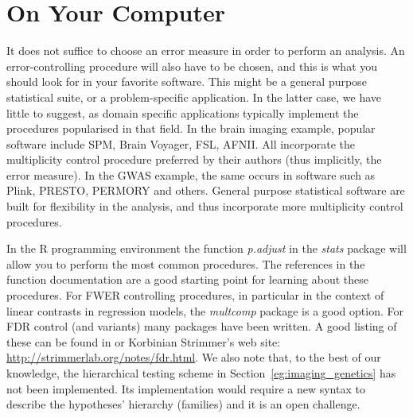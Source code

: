 \documentclass[review,12pt]{article}
\theoremstyle{definition}
\begin{document}








\appendix

\section{\label{sec:on_your_pc} On Your Computer}
It does not suffice to choose an error measure in order to perform an analysis. An error-controlling procedure will also have to be chosen, and this is what you should look for in your favorite software. This might be a general purpose statistical suite, or a problem-specific application. In the latter case, we have little to suggest, as domain specific applications typically implement the procedures popularised in that field. 
In the brain imaging example, popular software include SPM, Brain Voyager, FSL, AFNII. All incorporate the multiplicity control procedure preferred by their authors (thus implicitly, the error measure). 
In the GWAS example, the same occurs in software such as Plink, PRESTO, PERMORY and others. 
General purpose statistical software are built for flexibility in the analysis, and thus incorporate more multiplicity control procedures. 

In the R programming environment \citep{r_development_core_team_r:_2011} the function \emph{p.adjust} in the \emph{stats} package will allow you to perform the most common procedures. The references in the function documentation are a good starting point for learning about these procedures. 
For FWER controlling procedures, in particular in the context of linear contrasts in regression models, the \emph{multcomp} package is a good option. 
For FDR control (and variants) many packages have been written. A good listing of these can be found in \citet{bretz_multiple_2010} or Korbinian Strimmer's web site: \url{http://strimmerlab.org/notes/fdr.html}. 
We also note that, to the best of our knowledge, the hierarchical testing scheme in Section~\ref{eg:imaging_genetics} has not been implemented. Its implementation would require a new syntax to describe the hypotheses' hierarchy (families) and it is an open challenge. 
\end{document}

